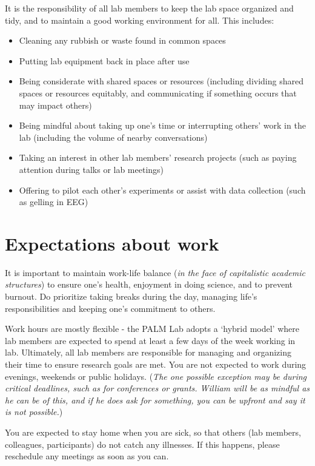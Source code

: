 \documentclass[
]{book}
\providecommand{\tightlist}{%
  \setlength{\itemsep}{0pt}\setlength{\parskip}{0pt}}
\begin{document}
It is the responsibility of all lab members to keep the lab space organized and tidy, and to maintain a good working environment for all. This includes:

\begin{itemize}
\tightlist
\item
  Cleaning any rubbish or waste found in common spaces
\item
  Putting lab equipment back in place after use
\item
  Being considerate with shared spaces or resources (including dividing shared spaces or resources equitably, and communicating if something occurs that may impact others)
\item
  Being mindful about taking up one's time or interrupting others' work in the lab (including the volume of nearby conversations)
\item
  Taking an interest in other lab members' research projects (such as paying attention during talks or lab meetings)
\item
  Offering to pilot each other's experiments or assist with data collection (such as gelling in EEG)
\end{itemize}

\hypertarget{lab-work}{%
\section{Expectations about work}\label{lab-work}}

It is important to maintain work-life balance (\emph{in the face of capitalistic academic structures}) to ensure one's health, enjoyment in doing science, and to prevent burnout. Do prioritize taking breaks during the day, managing life's responsibilities and keeping one's commitment to others.

Work hours are mostly flexible - the PALM Lab adopts a `hybrid model' where lab members are expected to spend at least a few days of the week working in lab. Ultimately, all lab members are responsible for managing and organizing their time to ensure research goals are met. You are not expected to work during evenings, weekends or public holidays. (\emph{The one possible exception may be during critical deadlines, such as for conferences or grants. William will be as mindful as he can be of this, and if he does ask for something, you can be upfront and say it is not possible.})

You are expected to stay home when you are sick, so that others (lab members, colleagues, participants) do not catch any illnesses. If this happens, please reschedule any meetings as soon as you can.
\end{document}
